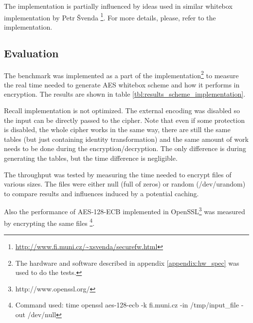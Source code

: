 \documentclass[11pt,oneside,final]{fithesis2}
\begin{document}
    The implementation is partially influenced by ideas used in similar whitebox implementation by Petr \v{S}venda \footnote{\url{http://www.fi.muni.cz/~xsvenda/securefw.html}}. 
    For more details, please, refer to the implementation.
    
    \subsection{Evaluation}
    The benchmark was implemented as a part of the implementation\footnote{The hardware and software described in appendix \ref{appendix:hw_spec} was used to do the tests. } to measure
    the real time needed to generate AES whitebox scheme and how it performs in encryption. The results are shown in table \ref{tbl:results_scheme_implementation}.
    
    Recall implementation is not optimized. The external encoding was disabled so the input can be directly passed to the 
    cipher. Note that even if some protection is disabled, the whole cipher works in the same way, there are still the same
    tables (but just containing identity transformation) and the same amount of work needs to be done during the encryption/decryption. 
    The only difference is during generating the tables, but the time difference is negligible.

    The throughput was tested by measuring the time needed to encrypt files of various sizes. The files were either null (full of zeros) or random (/dev/urandom)
    to compare results and influences induced by a potential caching.
    
    Also the performance of AES-128-ECB implemented in OpenSSL\footnote{http://www.openssl.org/} was measured by encrypting the same 
    files \footnote{Command used: time openssl aes-128-ecb -k fi.muni.cz  -in /tmp/input\_file -out /dev/null }.
    
\end{document}
